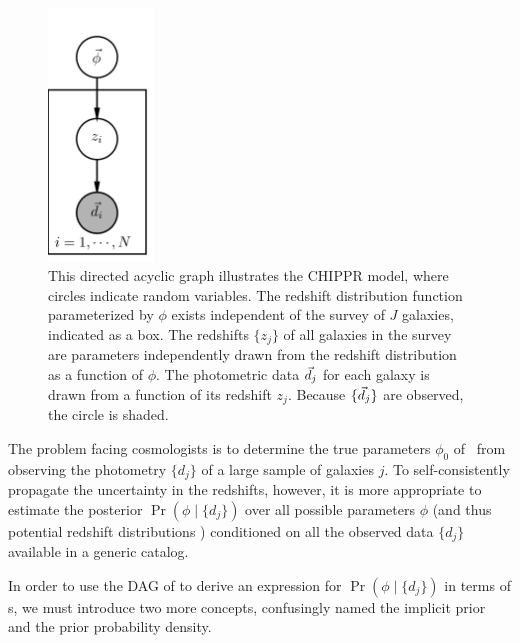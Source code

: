 \begin{figure}
	\begin{center}
		\includegraphics[width=0.25\textwidth]{figures/chippr/pgm.png}
		\caption{This directed acyclic graph illustrates the CHIPPR model, where circles indicate random variables.
			The redshift distribution function parameterized by $\phi$ exists independent of the survey of $J$ galaxies, indicated as a box.  
			The redshifts $\{z_{j}\}$ of all galaxies in the survey are parameters independently drawn from the redshift distribution as a function of $\phi$. 
			The photometric data $\vec{d}_{j}$ for each galaxy is drawn from a function of its redshift $z_{j}$.  
			Because $\{\vec{d}_{j}\}$ are observed, the circle is shaded.}
	\end{center}
\end{figure}

The problem facing cosmologists is to determine the true parameters $\phi_{0}$ of \nz\ from observing the photometry $\{d_{j}\}$ of a large sample of galaxies $j$.
To self-consistently propagate the uncertainty in the redshifts, however, it is more appropriate to estimate the posterior $\Pr(\phi \mid \{d_{j}\})$ over all possible parameters $\phi$ (and thus potential redshift distributions \nz ) conditioned on all the observed data $\{d_{j}\}$ available in a generic catalog.

In order to use the DAG of  to derive an expression for $\Pr(\phi \mid \{d_{j}\})$ in terms of \pzpdf s, we must introduce two more concepts, confusingly named the implicit prior and the prior probability density.

